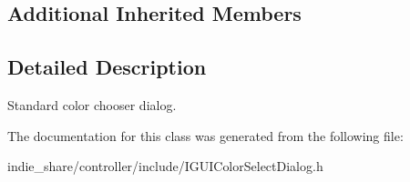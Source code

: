 \subsection*{Additional Inherited Members}


\subsection{Detailed Description}
Standard color chooser dialog. 

The documentation for this class was generated from the following file\+:\begin{DoxyCompactItemize}
\item 
indie\+\_\+share/controller/include/I\+G\+U\+I\+Color\+Select\+Dialog.\+h\end{DoxyCompactItemize}
